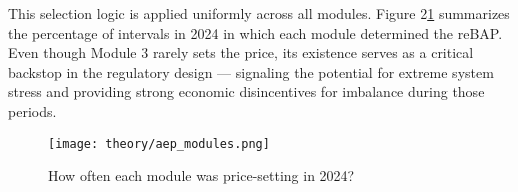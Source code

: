 \documentclass[class=scrbook, crop=false]{standalone}
\begin{document}
This selection logic is applied uniformly across all modules. Figure 2\ref{fig::aep_modules} summarizes the percentage of intervals in 2024 in which each module determined the reBAP.
Even though Module 3 rarely sets the price, its existence serves as a critical backstop in the regulatory design — signaling the potential for extreme system stress and providing strong economic disincentives for imbalance during those periods.



 \begin{figure}[ht]
            \centering
            \texttt{[image: theory/aep\_modules.png]}
             \caption[How often each module was price-setting in 2024?]{How often each module was price-setting in 2024?}
            \label{fig::aep_modules}
 \end{figure}



\ifstandalone
    \printbibliography[heading=bibintoc]                         \cleardoublepage




\fi
\end{document}
